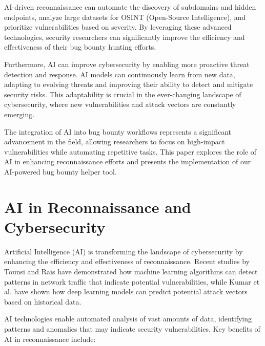 \documentclass[conference]{IEEEtran}
\begin{document}
AI-driven reconnaissance can automate the discovery of subdomains and hidden endpoints, analyze large datasets for OSINT (Open-Source Intelligence), and prioritize vulnerabilities based on severity. By leveraging these advanced technologies, security researchers can significantly improve the efficiency and effectiveness of their bug bounty hunting efforts.

Furthermore, AI can improve cybersecurity by enabling more proactive threat detection and response. AI models can continuously learn from new data, adapting to evolving threats and improving their ability to detect and mitigate security risks. This adaptability is crucial in the ever-changing landscape of cybersecurity, where new vulnerabilities and attack vectors are constantly emerging.

The integration of AI into bug bounty workflows represents a significant advancement in the field, allowing researchers to focus on high-impact vulnerabilities while automating repetitive tasks. This paper explores the role of AI in enhancing reconnaissance efforts and presents the implementation of our AI-powered bug bounty helper tool.

\section{AI in Reconnaissance and Cybersecurity}
Artificial Intelligence (AI) is transforming the landscape of cybersecurity by enhancing the efficiency and effectiveness of reconnaissance. Recent studies by Tounsi and Rais \cite{tounsi2018} have demonstrated how machine learning algorithms can detect patterns in network traffic that indicate potential vulnerabilities, while Kumar et al. \cite{kumar2019} have shown how deep learning models can predict potential attack vectors based on historical data.

AI technologies enable automated analysis of vast amounts of data, identifying patterns and anomalies that may indicate security vulnerabilities. Key benefits of AI in reconnaissance include:
\end{document}
